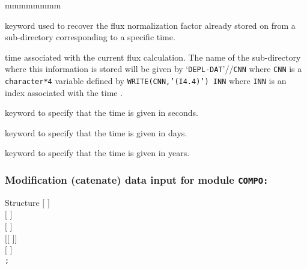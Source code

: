 \begin{ListeDeDescription}{mmmmmmmm}
\item[\moc{SET}] keyword used to recover the flux normalization factor already
stored on  from a sub-directory corresponding to a specific time.

\item[\dusa{xtr}] time associated with the current flux calculation. The
name of the sub-directory where this information is stored will be given by
`{\tt DEPL-DAT}'//{\tt CNN} where {\tt CNN} is a  {\tt character*4} variable
defined by  {\tt WRITE(CNN,'(I4.4)') INN} where {\tt INN} is an index associated
with the time .

\item[\moc{S}] keyword to specify that the time is given in seconds.

\item[\moc{DAY}] keyword to specify that the time is given in days.

\item[\moc{YEAR}] keyword to specify that the time is given in years.

\end{ListeDeDescription}

\subsubsection{Modification (catenate) data input for module {\tt COMPO:}}\label{sect:desccpo3}

\vskip -0.5cm

\begin{DataStructure}{Structure }
$[$   $]$ \\
$[$    $]$ \\
$[$   $]$ \\
$[[$   $]]$ \\
$[$  $]$ \\
{\tt ;}
\end{DataStructure}

